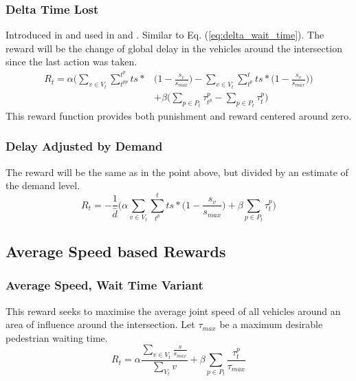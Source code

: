 \documentclass[conference]{IEEEtran}
\begin{document}
\subsubsection{Delta Time Lost}
Introduced in \cite{abdulhai2010} and used in \cite{mannion} \cite{genders2016} \cite{gao2017} \cite{mousavi2017} and \cite{genders2018}.
Similar to Eq. (\ref{eq:delta_wait_time}).
The reward will be the change of global delay in the vehicles around the intersection since the last action was taken.
\begin{equation}
\begin{split}
R_t =  \alpha \bigg( \sum_{v \in V_t} \sum_{t^{pp}}^{t^p} ts * & \big( 1-\frac{s_v}{s_{max}} \big) - \sum_{v \in V_t}  \sum_{t^p}^t ts * \big( 1-\frac{s_v}{s_{max}} \big) \bigg) \\
& + \beta \bigg( \sum_{p \in P_t} \tau^p_{t^p} - \sum_{p \in P_t} \tau^p_{t} \bigg) 
\end{split}
\label{eq:changedelay} 
\end{equation}
This reward function provides both punishment and reward centered around zero.

\subsubsection{Delay Adjusted by Demand}
The reward will be the same as in the point above, but divided by an estimate of the demand level.
\begin{equation}
    R_t = -\frac{1}{\hat{d}} \bigg( \alpha \sum_{v\in V_t}  \sum_{t^p}^t ts * \big( 1-\frac{s_v}{s_{max}} \big) + \beta \sum_{p \in P_t} \tau^p_{t} \bigg)
\label{eq:delay}
\end{equation}

\subsection{Average Speed based Rewards}
\subsubsection{Average Speed, Wait Time Variant}
This reward seeks to maximise the average joint speed of all vehicles around an area of influence around the intersection. Let $\tau_{max}$ be a maximum desirable pedestrian waiting time.
\begin{equation}
    R_t = \alpha \frac{\sum_{v \in V_t} \frac{s}{s_{max}}}{\sum_{V_t} v}  + \beta \sum_{p \in P_t} \frac{\tau^p_{t}}{\tau_{max}}
\label{eq:avgspeed_wait}
\end{equation}
\end{document}
